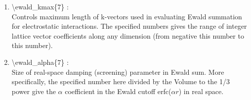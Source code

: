 \documentclass[12pt,titlepage]{article}
\begin{document}
\begin{enumerate}

 \vspace{0.15in} 
 \item   \textbackslash ewald\_kmax\{7\} : \\
  Controls maximum length of k-vectors used in evaluating Ewald summation for 
  electrostatic interactions.  The specified numbers gives the range of integer lattice vector coefficients along any dimension (from negative this number to this number).

 \vspace{0.15in} 
 \item   \textbackslash ewald\_alpha\{7\} : \\
  Size of real-space damping (screening) parameter in Ewald sum.  More specifically, the specified number here divided by the Volume to the 1/3 power give the $\alpha$ coefficient in the Ewald cutoff erfc($\alpha r$) in real space.

%
%
%
%
%
%


\end{enumerate}
\end{document}
